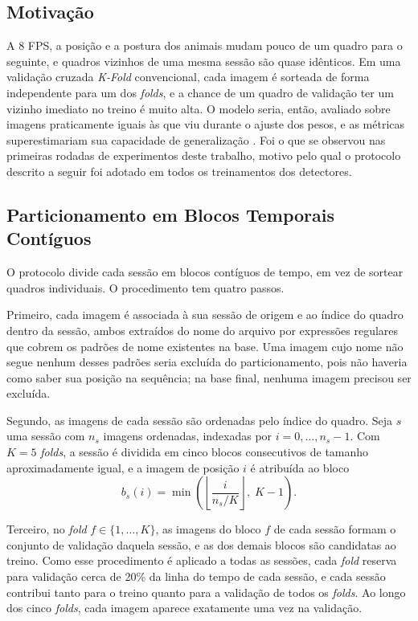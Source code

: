 \subsection{Motivação}
\label{subsec:motivacao-protocolo}

A 8 FPS, a posição e a postura dos animais mudam pouco de um quadro para o seguinte, e quadros vizinhos de uma mesma sessão são quase idênticos. Em uma validação cruzada \textit{K-Fold} convencional, cada imagem é sorteada de forma independente para um dos \textit{folds}, e a chance de um quadro de validação ter um vizinho imediato no treino é muito alta. O modelo seria, então, avaliado sobre imagens praticamente iguais às que viu durante o ajuste dos pesos, e as métricas superestimariam sua capacidade de generalização \cite{kaufman2012leakage, roberts2017crossvalidation}. Foi o que se observou nas primeiras rodadas de experimentos deste trabalho, motivo pelo qual o protocolo descrito a seguir foi adotado em todos os treinamentos dos detectores.

\subsection{Particionamento em Blocos Temporais Contíguos}
\label{subsec:blocos-temporais}

O protocolo divide cada sessão em blocos contíguos de tempo, em vez de sortear quadros individuais. O procedimento tem quatro passos.

Primeiro, cada imagem é associada à sua sessão de origem e ao índice do quadro dentro da sessão, ambos extraídos do nome do arquivo por expressões regulares que cobrem os padrões de nome existentes na base. Uma imagem cujo nome não segue nenhum desses padrões seria excluída do particionamento, pois não haveria como saber sua posição na sequência; na base final, nenhuma imagem precisou ser excluída.

Segundo, as imagens de cada sessão são ordenadas pelo índice do quadro. Seja $s$ uma sessão com $n_s$ imagens ordenadas, indexadas por $i = 0, \ldots, n_s - 1$. Com $K = 5$ \textit{folds}, a sessão é dividida em cinco blocos consecutivos de tamanho aproximadamente igual, e a imagem de posição $i$ é atribuída ao bloco
\begin{equation}
    b_s(i) = \min\left( \left\lfloor \frac{i}{n_s / K} \right\rfloor ,\; K - 1 \right).
    \label{eq:bloco-temporal}
\end{equation}

Terceiro, no \textit{fold} $f \in \{1, \ldots, K\}$, as imagens do bloco $f$ de cada sessão formam o conjunto de validação daquela sessão, e as dos demais blocos são candidatas ao treino. Como esse procedimento é aplicado a todas as sessões, cada \textit{fold} reserva para validação cerca de 20\% da linha do tempo de cada sessão, e cada sessão contribui tanto para o treino quanto para a validação de todos os \textit{folds}. Ao longo dos cinco \textit{folds}, cada imagem aparece exatamente uma vez na validação.

